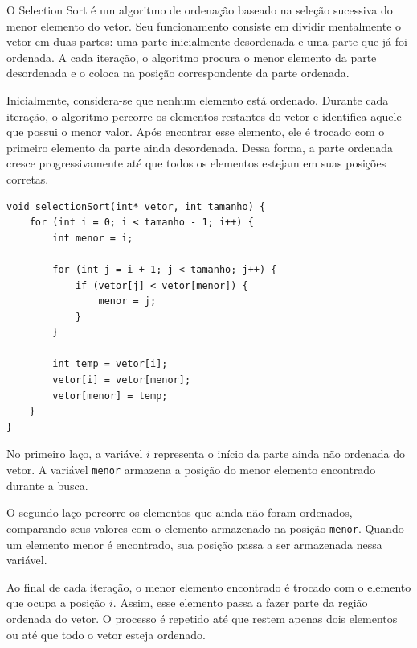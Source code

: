 \quad O Selection Sort é um algoritmo de ordenação baseado na seleção
sucessiva do menor elemento do vetor. Seu funcionamento consiste em
dividir mentalmente o vetor em duas partes: uma parte inicialmente
desordenada e uma parte que já foi ordenada. A cada iteração, o algoritmo
procura o menor elemento da parte desordenada e o coloca na posição
correspondente da parte ordenada.

\quad Inicialmente, considera-se que nenhum elemento está ordenado.
Durante cada iteração, o algoritmo percorre os elementos restantes do
vetor e identifica aquele que possui o menor valor. Após encontrar esse
elemento, ele é trocado com o primeiro elemento da parte ainda
desordenada. Dessa forma, a parte ordenada cresce progressivamente até
que todos os elementos estejam em suas posições corretas.

\begin{lstlisting}[caption={Implementação do Selection Sort}]
void selectionSort(int* vetor, int tamanho) {
    for (int i = 0; i < tamanho - 1; i++) {
        int menor = i; 

        for (int j = i + 1; j < tamanho; j++) {
            if (vetor[j] < vetor[menor]) {
                menor = j; 
            }
        }

        int temp = vetor[i];
        vetor[i] = vetor[menor];
        vetor[menor] = temp;
    }
}
\end{lstlisting}

\quad No primeiro laço, a variável $i$ representa o início da parte ainda
não ordenada do vetor. A variável \texttt{menor} armazena a posição do
menor elemento encontrado durante a busca.

\quad O segundo laço percorre os elementos que ainda não foram ordenados,
comparando seus valores com o elemento armazenado na posição
\texttt{menor}. Quando um elemento menor é encontrado, sua posição passa
a ser armazenada nessa variável.

\quad Ao final de cada iteração, o menor elemento encontrado é trocado
com o elemento que ocupa a posição $i$. Assim, esse elemento passa a
fazer parte da região ordenada do vetor. O processo é repetido até que
restem apenas dois elementos ou até que todo o vetor esteja ordenado.
